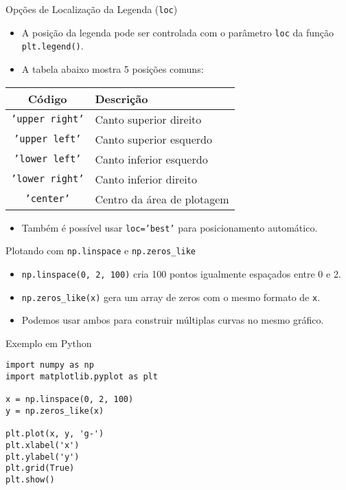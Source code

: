 \begin{frame}{Opções de Localização da Legenda (\texttt{loc})}
    \begin{itemize}
        \item A posição da legenda pode ser controlada com o parâmetro \texttt{loc} da função \texttt{plt.legend()}.
        \item A tabela abaixo mostra 5 posições comuns:
    \end{itemize}

    \vspace{0.5em}
    \begin{table}[]
        \centering
        \begin{tabular}{|c|l|}
            \hline
            \textbf{Código}        & \textbf{Descrição}         \\ \hline
            \texttt{'upper right'} & Canto superior direito     \\ \hline
            \texttt{'upper left'}  & Canto superior esquerdo    \\ \hline
            \texttt{'lower left'}  & Canto inferior esquerdo    \\ \hline
            \texttt{'lower right'} & Canto inferior direito     \\ \hline
            \texttt{'center'}      & Centro da área de plotagem \\ \hline
        \end{tabular}
    \end{table}

    \vspace{0.5em}
    \begin{itemize}
        \item Também é possível usar \texttt{loc='best'} para posicionamento automático.
    \end{itemize}
\end{frame}


\begin{frame}[fragile]{Plotando com \texttt{np.linspace} e \texttt{np.zeros\_like}}
    \begin{itemize}
        \item \texttt{np.linspace(0, 2, 100)} cria 100 pontos igualmente espaçados entre 0 e 2.
        \item \texttt{np.zeros\_like(x)} gera um array de zeros com o mesmo formato de \texttt{x}.
        \item Podemos usar ambos para construir múltiplas curvas no mesmo gráfico.
    \end{itemize}

    \begin{block}{Exemplo em Python}
        \begin{verbatim}
import numpy as np
import matplotlib.pyplot as plt

x = np.linspace(0, 2, 100)
y = np.zeros_like(x)

plt.plot(x, y, 'g-')
plt.xlabel('x')
plt.ylabel('y')
plt.grid(True)
plt.show()
\end{verbatim}
    \end{block}
\end{frame}


